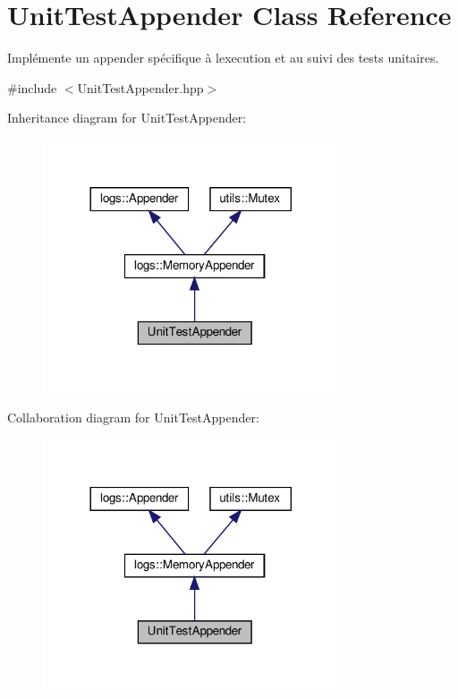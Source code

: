 \hypertarget{classUnitTestAppender}{}\section{Unit\+Test\+Appender Class Reference}
\label{classUnitTestAppender}


Implémente un appender spécifique à l\textquotesingle{}execution et au suivi des tests unitaires.  




{\ttfamily \#include $<$Unit\+Test\+Appender.\+hpp$>$}



Inheritance diagram for Unit\+Test\+Appender\+:
\nopagebreak
\begin{figure}[H]
\begin{center}
\leavevmode
\includegraphics[width=248pt]{classUnitTestAppender__inherit__graph}
\end{center}
\end{figure}


Collaboration diagram for Unit\+Test\+Appender\+:
\nopagebreak
\begin{figure}[H]
\begin{center}
\leavevmode
\includegraphics[width=248pt]{classUnitTestAppender__coll__graph}
\end{center}
\end{figure}
